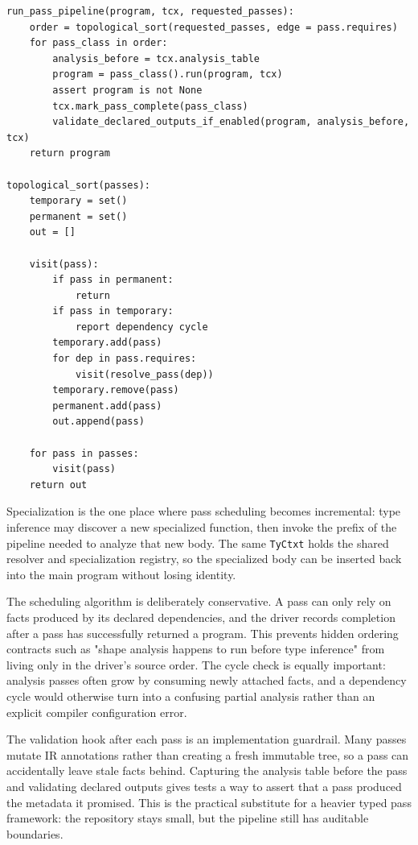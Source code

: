 \begin{lstlisting}[style=pythoncode,caption={Dependency-ordered pass execution.}]
run_pass_pipeline(program, tcx, requested_passes):
    order = topological_sort(requested_passes, edge = pass.requires)
    for pass_class in order:
        analysis_before = tcx.analysis_table
        program = pass_class().run(program, tcx)
        assert program is not None
        tcx.mark_pass_complete(pass_class)
        validate_declared_outputs_if_enabled(program, analysis_before, tcx)
    return program

topological_sort(passes):
    temporary = set()
    permanent = set()
    out = []

    visit(pass):
        if pass in permanent:
            return
        if pass in temporary:
            report dependency cycle
        temporary.add(pass)
        for dep in pass.requires:
            visit(resolve_pass(dep))
        temporary.remove(pass)
        permanent.add(pass)
        out.append(pass)

    for pass in passes:
        visit(pass)
    return out
\end{lstlisting}

Specialization is the one place where pass scheduling becomes incremental:
type inference may discover a new specialized function, then invoke the prefix
of the pipeline needed to analyze that new body. The same \texttt{TyCtxt}
holds the shared resolver and specialization registry, so the specialized body
can be inserted back into the main program without losing identity.

The scheduling algorithm is deliberately conservative. A pass can only rely on
facts produced by its declared dependencies, and the driver records completion
after a pass has successfully returned a program. This prevents hidden ordering
contracts such as "shape analysis happens to run before type inference" from
living only in the driver's source order. The cycle check is equally important:
analysis passes often grow by consuming newly attached facts, and a dependency
cycle would otherwise turn into a confusing partial analysis rather than an
explicit compiler configuration error.

The validation hook after each pass is an implementation guardrail. Many passes
mutate IR annotations rather than creating a fresh immutable tree, so a pass can
accidentally leave stale facts behind. Capturing the analysis table before the
pass and validating declared outputs gives tests a way to assert that a pass
produced the metadata it promised. This is the practical substitute for a
heavier typed pass framework: the repository stays small, but the pipeline still
has auditable boundaries.

